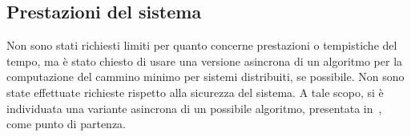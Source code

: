\subsection{Prestazioni del sistema}
Non sono stati richiesti limiti per quanto concerne prestazioni o tempistiche del tempo, ma è stato chiesto
di usare una versione asincrona di un algoritmo per la computazione del cammino minimo per sistemi distribuiti, se possibile.
Non sono state effettuate richieste rispetto alla sicurezza del sistema.
A tale scopo, si è individuata una variante asincrona di un possibile algoritmo, presentata in~\cite{ILIE2013762}, come punto di partenza.


